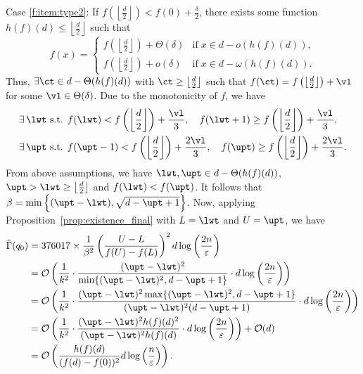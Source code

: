 \documentclass[onecolumn,letterpaper]{IEEEtran}
\newcommand{\cO}{{\cal O}}
\newcommand{\cp}{{q}}
\newcommand{\up}{{U}}
\newcommand{\lw}{{L}}
\newcommand{\fgap}{{\delta}}
\newcommand{\fh}{{h(f)}}
\newcommand{\bet}{{\beta}}
\newcommand{\exifinal}{{ 376017 \times \frac{1}{\bet^2} \left( \frac{\up-\lw}{f(\up)-f(\lw)} \right)^2  d\log \left( \frac{2n}{\varepsilon } \right)}}
\newcommand{\ftaup}{{\hat{\Gamma}}}
\newcommand{\cpns}{\cp_0}
\newcommand{\fTpns}{\ftaup (\cpns)}
\begin{document}
Case \ref{f:item:type2}: If $f\left(\left\lfloor \frac {d} {2}\right \rfloor\right)< f(0)+\frac {\fgap}{2}$, there exists some function $\fh(d)\le \left\lfloor \frac {d} {2}\right \rfloor$ such that 
\begin{equation} \label{eq:def:hp}
    f(x) = 
    \left\{
    \begin{array}{ll}
   f\left(\left\lfloor \frac {d} {2}\right\rfloor\right)+\Theta(\fgap) & \text{if} \; x\in d-o(\fh(d)), \\
   f\left(\left\lfloor \frac {d} {2}\right \rfloor\right)+o(\fgap) & \text{if} \; x\in d-\omega(\fh(d)).
    \end{array} 
    \right.
\end{equation}
Thus, $\exists \ct \in d-\Theta(\fh(d))$ with $\ct \geq \left\lfloor \frac {d} {2}\right \rfloor$ such that $f(\ct)=f\left(\left\lfloor \frac {d} {2}\right \rfloor\right)+\vl$ for some $\vl \in \Theta (\fgap)$. Due to the monotonicity of $f$, we have
\begin{align*}
    &\exists\, \lwt \text{ s.t. } f(\lwt) < f\left(\left\lfloor \frac {d} {2}\right\rfloor \right ) + \frac{\vl}{3} ,\quad f(\lwt+1) \ge f\left(\left\lfloor \frac {d} {2}\right \rfloor\right) + \frac{\vl}{3}, \\ 
    &\exists\, \upt \text{ s.t. } f(\upt-1) < f\left(\left\lfloor \frac {d} {2}\right \rfloor\right) + \frac{2\vl}{3} ,\quad f(\upt) \ge f\left(\left\lfloor \frac {d} {2}\right \rfloor\right) + \frac{2\vl}{3}.
\end{align*}
From above assumptions, we have $\lwt,\upt \in d-\Theta(\fh(d))$, $\upt > \lwt \geq \left\lfloor \frac {d} {2}\right \rfloor $ and $f(\lwt)<f(\upt)$. It follows that $\bet=\min\left\{ (\upt-\lwt),\sqrt{d-\upt+1} \right\}$. Now, applying Proposition~\ref{prop:existence_final} with $\lw=\lwt$ and $\up=\upt$, we have 
\begin{align*}
    \fTpns &= \exifinal \\
    &= \cO \left(\frac{1}{k^2} \cdot \frac{(\upt-\lwt)^2}{\min\{ (\upt-\lwt)^2,d-\upt+1 \}} \cdot d \log\left(\frac{2n}{\varepsilon}\right) \right) \\ 
    &= \cO \left(\frac{1}{k^2} \cdot \frac{(\upt-\lwt)^2\max\{ (\upt-\lwt)^2,d-\upt+1 \}}{(\upt-\lwt)^2 (d-\upt+1)} \cdot d \log\left(\frac{2n}{\varepsilon}\right) \right) \\ 
    &= \cO \left(\frac{1}{k^2} \cdot \frac{(\upt-\lwt)^2 \fh(d)^2}{(\upt-\lwt)^2 \fh(d)} \cdot d \log\left(\frac{2n}{\varepsilon}\right) \right) + \cO(d) \\ 
    &= \cO \left( \frac{\fh(d)}{(f(d)-f(0))^2} d \log \left(\frac{n}{\varepsilon}\right) \right) .
\end{align*}
\end{document}
